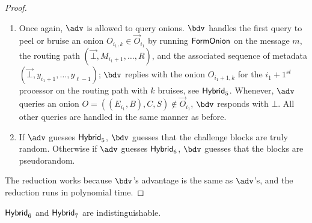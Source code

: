 \documentclass[runningheads,a4paper]{llncs}
\begin{document}
\begin{proof}
\begin{enumerate}
\item Once again, $\adv$ is allowed to query onions. $\bdv$ handles the first query to peel or bruise an onion $O_{i_1, k} \in \vec{O}_{i_1}$ by running $\mathsf{FormOnion}$ on the message $m$, the routing path $(\vec{\bot}, M_{i_1+1}, \dots, R)$, and the associated sequence of metadata $(\vec{\bot}, y_{i_1+1}, \dots, y_{\ell-1})$; $\bdv$ replies with the onion $O_{i_1+1, k}$ for the $i_1+1^\mathit{st}$ processor on the routing path with $k$ bruises, see $\mathsf{Hybrid}_{5}$. 
Whenever, $\adv$ queries an onion $O = ((E_{i_1}, B), C, S) \not\in \vec{O}_{i_1}$, $\bdv$ responds with $\bot$. 
All other queries are handled in the same manner as before. 

\item If $\adv$ guesses $\mathsf{Hybrid}_{5}$, $\bdv$ guesses that the challenge blocks are truly random. Otherwise if $\adv$ guesses $\mathsf{Hybrid}_{6}$, $\bdv$ guesses that the blocks are pseudorandom. 
\end{enumerate}
The reduction works because $\bdv$'s advantage is the same as $\adv$'s, and the reduction runs in polynomial time. 
\end{proof}


\begin{lemma}
$\mathsf{Hybrid}_{6}$ and $\mathsf{Hybrid}_{7}$ are indistinguishable. 
\end{lemma}
\end{document}
